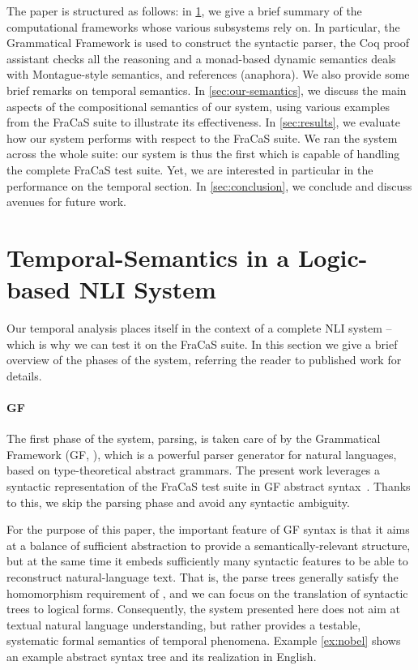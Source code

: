 \documentclass[a4paper,twoside]{article}
\begin{document}
The paper is structured as follows: in \cref{sec:background}, we give
a brief summary of the computational frameworks whose various
subsystems rely on. In particular, the Grammatical Framework is used
to construct the syntactic parser, the Coq proof assistant checks all
the reasoning and a monad-based dynamic semantics deals with
Montague-style semantics, and references (anaphora).  We also provide
some brief remarks on temporal semantics. In \cref{sec:our-semantics},
we discuss the main aspects of the compositional semantics of our
system, using various examples from the FraCaS suite to illustrate its
effectiveness. In \cref{sec:results}, we evaluate how our system
performs with respect to the FraCaS suite. We ran the system across
the whole suite: our system is thus the first which is capable of
handling the complete FraCaS test suite.  Yet, we are interested in
particular in the performance on the temporal section. In
\cref{sec:conclusion}, we conclude and discuss avenues for future
work.


\section{Temporal-Semantics in a Logic-based NLI System}
\label{sec:background}

Our temporal analysis places itself in the context of a complete NLI
system -- which is why we can test it on the FraCaS suite. In this
section we give a brief overview of the phases of the system,
referring the reader to published work for details.

\paragraph{GF}
The first phase of the system, parsing, is taken care of by the 
Grammatical Framework (GF, \citet{ranta_grammatical_2004}), which is a
powerful parser generator for natural languages, based on
type-theoretical abstract grammars.  The present work leverages a
syntactic representation of the FraCaS test suite in GF abstract
syntax~\citep{Ljunglof:2012}. Thanks to this, we skip the parsing
phase and avoid any syntactic ambiguity.

For the purpose of this paper, the important feature of GF
syntax is that it aims at a balance of sufficient abstraction to provide a
semantically-relevant structure, but at the same time it embeds
sufficiently many syntactic features to be able to reconstruct
natural-language text. That is, the parse trees generally satisfy the
homomorphism requirement of \citet{montague_english_1970,montague_proper_1974}, and
we can focus on the translation of syntactic trees to logical forms.
%
Consequently, the system presented
here does not aim at textual natural language understanding, but rather
provides a testable, systematic formal semantics of temporal phenomena.
Example \ref{ex:nobel} shows an example abstract syntax tree and its
realization in English.
\end{document}
